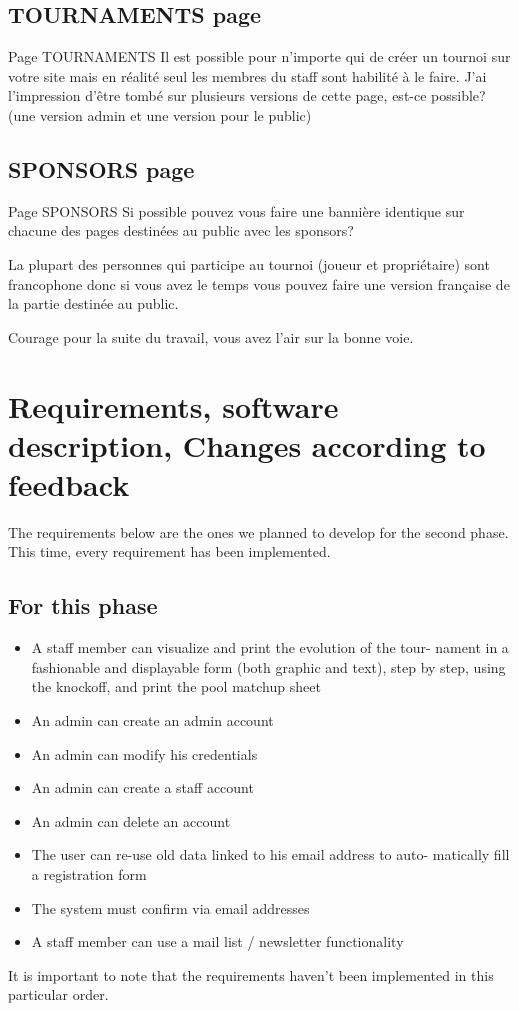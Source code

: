 \documentclass[a4paper, 12pt]{article}
\begin{document}
\subsection*{TOURNAMENTS page}
Page TOURNAMENTS
Il est possible pour n'importe qui de créer un tournoi sur votre site mais en réalité seul les membres du staff sont habilité à le faire. J'ai l'impression d'être tombé sur plusieurs versions de cette page, est-ce possible? (une version admin et une version pour le public)

\subsection*{SPONSORS page}
Page SPONSORS
Si possible pouvez vous faire une bannière identique sur chacune des pages destinées au public avec les sponsors?

La plupart des personnes qui participe au tournoi (joueur et propriétaire) sont francophone donc si vous avez le temps vous pouvez faire une version française de la partie destinée au public.

Courage pour la suite du travail, vous avez l'air sur la bonne voie. 
\section{Requirements, software description, Changes according to feedback}

The requirements below are the ones we planned to develop for the second phase. This time, every requirement has been implemented. \\
\subsection{For this phase}
	
\begin{itemize}
 
\item A staff member can visualize and print the evolution of the tour- nament in a fashionable and displayable form (both graphic and text), step by step, using the knockoff, and print the pool matchup sheet
\item An admin can create an admin account
\item An admin can modify his credentials
\item An admin can create a staff account
\item An admin can delete an account
\item The user can re-use old data linked to his email address to auto- matically fill a registration form
\item The system must confirm via email addresses
\item A staff member can use a mail list / newsletter functionality
\\
\end{itemize}
It is important to note that the requirements haven't been implemented in this particular order.\\
\end{document}
